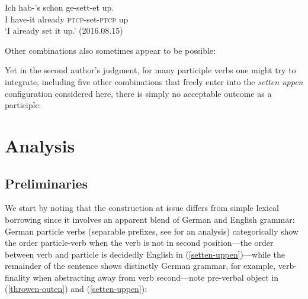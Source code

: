 \documentclass[output=paper]{langscibook}
\begin{document}
\ea\gll Ich hab-'s schon ge-sett-et up.\\
I have-it already \textsc{ptcp}-set-\textsc{ptcp} up\\
\glt `I already set it up.' (2016.08.15)
\z 

Other combinations also sometimes appear to be possible: 

\ea
{}
\z\z 

Yet in the second author's judgment, for many participle verbs one might try to integrate, including five other combinations that freely enter into the \textit{setten uppen} configuration considered here, there is simply no acceptable outcome as a participle:

\ea
{}
\z\z 

\section{Analysis}

\subsection{Preliminaries}

We start by noting that the construction at issue differs from simple lexical borrowing since it involves an apparent blend of German and English grammar: German particle verbs (separable prefixes, see \cite{wurmbrand98} for an analysis) categorically show the order particle-verb when the verb is not in second position---the order between verb and particle is decidedly English in (\ref{setten-uppen})---while the remainder of the sentence shows distinctly German grammar, for example, verb-finality when abstracting away from verb second---note pre-verbal object in (\ref{throwen-outen}) and (\ref{setten-uppen}):
\end{document}
